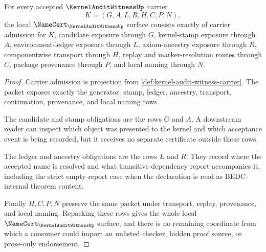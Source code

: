 \begin{theorem}
\label{thm:kernel-audit-witness-namecert-obligations}
For every accepted $\KernelAuditWitnessUp$ carrier
$$
K=(G,A,L,R,H,C,P,N),
$$
the local $\NameCert_{\KernelAuditWitnessUp}$ surface consists exactly of carrier admission for $K$, candidate exposure through $G$, kernel-stamp exposure through $A$, environment-ledger exposure through $L$, axiom-ancestry exposure through $R$, componentwise transport through $H$, replay and marker-resolution routes through $C$, package provenance through $P$, and local naming through $N$.
\end{theorem}
\begin{proof}
Carrier admission is projection from \autoref{def:kernel-audit-witness-carrier}. The packet exposes exactly the generator, stamp, ledger, ancestry, transport, continuation, provenance, and local naming rows.

The candidate and stamp obligations are the rows $G$ and $A$. A downstream reader can inspect which object was presented to the kernel and which acceptance event is being recorded, but it receives no separate certificate outside those rows.

The ledger and ancestry obligations are the rows $L$ and $R$. They record where the accepted name is resolved and what transitive dependency report accompanies it, including the strict empty-report case when the declaration is read as BEDC-internal theorem content.

Finally $H,C,P,N$ preserve the same packet under transport, replay, provenance, and local naming. Repacking these rows gives the whole local $\NameCert_{\KernelAuditWitnessUp}$ surface, and there is no remaining coordinate from which a consumer could import an unlisted checker, hidden proof source, or prose-only endorsement.
\end{proof}

